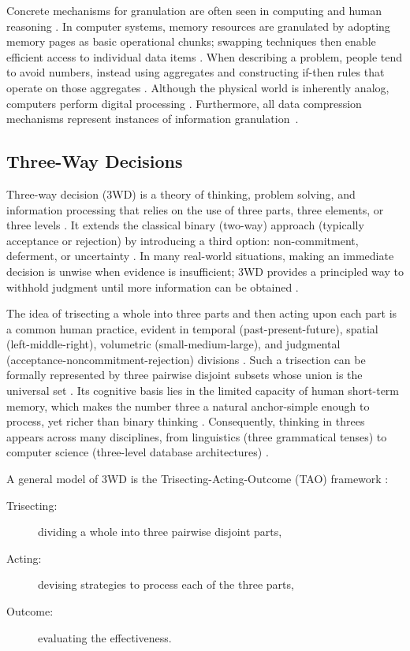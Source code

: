 \documentclass[a4paper,twoside,12pt]{book}
\begin{document}
Concrete mechanisms for granulation are often seen in computing and human reasoning \cite{bargiela2003granular}. In computer systems, memory resources are granulated by adopting memory pages as basic operational chunks; swapping techniques then enable efficient access to individual data items \cite{bargiela2003granular}. When describing a problem, people tend to avoid numbers, instead using aggregates and constructing if-then rules that operate on those aggregates \cite{bargiela2003granular}. Although the physical world is inherently analog, computers perform digital processing \cite{bargiela2003granular}. Furthermore, all data compression mechanisms represent instances of information granulation~\cite{bargiela2003granular}.

\subsection{Three-Way Decisions}

Three-way decision (3WD) is a theory of thinking, problem solving, and information processing that relies on the use of three parts, three elements, or three levels \cite{Yao2018threeway}. It extends the classical binary (two-way) approach (typically acceptance or rejection) by introducing a third option: non-commitment, deferment, or uncertainty \cite{Fujita2016threeway, Yao2018threeway}. In many real-world situations, making an immediate decision is unwise when evidence is insufficient; 3WD provides a principled way to withhold judgment until more information can be obtained \cite{Yao2018threeway}.

The idea of trisecting a whole into three parts and then acting upon each part is a common human practice, evident in temporal (past-present-future), spatial (left-middle-right), volumetric (small-medium-large), and judgmental (acceptance-noncommitment-rejection) divisions \cite{Fujita2016threeway}. Such a trisection can be formally represented by three pairwise disjoint subsets whose union is the universal set \cite{Fujita2016threeway}. Its cognitive basis lies in the limited capacity of human short-term memory, which makes the number three a natural anchor-simple enough to process, yet richer than binary thinking \cite{Yao2018threeway}. Consequently, thinking in threes appears across many disciplines, from linguistics (three grammatical tenses) to computer science (three-level database architectures) \cite{Yao2018threeway}.

 A general model of 3WD is the Trisecting-Acting-Outcome (TAO) framework \cite{Yao2018threeway}:
\begin{description}
	\item[Trisecting:] dividing a whole into three pairwise disjoint parts,
	\item[Acting:] devising strategies to process each of the three parts,
	\item[Outcome:] evaluating the effectiveness.
\end{description}  
\end{document}

